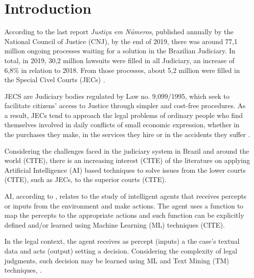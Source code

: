 \chapter{Introduction}





According to the last report \textit{Justiça em Números}, published annually by the National Council of Justice (CNJ), by the end of 2019, there was around 77,1 million ongoing processes waiting for a solution in the Brazilian Judiciary. In total, in 2019, 30,2 million lawsuits were filled in all Judiciary, an increase of 6,8\% in relation to 2018. From those processes, about 5,2 million were filled in the Special Civel Courts (JECs)  \cite{CNJ2020}. 

JECS are Judiciary bodies regulated by Law no. 9,099/1995, which seek to facilitate citizens' access to Justice through simpler and cost-free procedures. As a result, JECs tend to approach the legal problems of ordinary people who find themselves involved in daily conflicts of small economic expression, whether in the purchases they make, in the services they hire or in the accidents they suffer \cite{Watanabe1985}.

Considering the challenges faced in the judiciary system in Brazil and around the world (CITE), there is an increasing interest (CITE) of the literature on applying Artificial Intelligence (AI) based techniques to solve issues from the lower courts (CITE), such as JECs, to the superior courts (CITE).

AI, according to \textcite{Russell2020}, relates to the study of intelligent agents that receives percepts or inputs from the environment and make actions. The agent uses a function to map the percepts to the appropriate actions and such function can be explicitly defined and/or learned using Machine Learning (ML) techniques (CITE).


 In the legal context, the agent receives as percept (inputs) a the case's  textual data and acts (output) setting a decision. Considering the complexity of legal judgments, such decision may be learned using ML and Text Mining (TM) techniques, .

